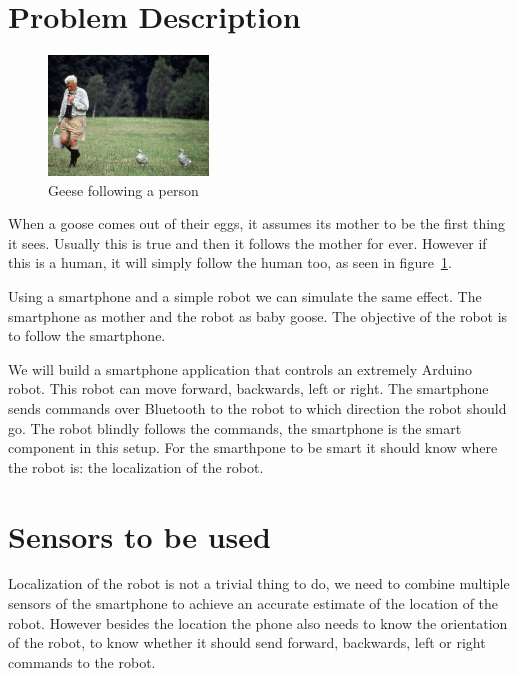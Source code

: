 \documentclass{article}
\author{Arian Stolwijk}
\begin{document}
\section{Problem Description}

\begin{figure}
  \vspace{-30pt}
  \begin{center}
    \includegraphics[width=0.38\textwidth]{geese.jpg}
    \vspace{-20pt}
  \end{center}
  \caption{Geese following a person}
\label{fig:geese}
\end{figure}

When a goose comes out of their eggs, it assumes its mother to be the first
thing it sees. Usually this is true and then it follows the mother for ever.
However if this is a human, it will simply follow the human too, as seen in
figure~\ref{fig:geese}.

Using a smartphone and a simple robot we can simulate the same effect. The
smartphone as mother and the robot as baby goose. The objective of the robot is
to follow the smartphone.

We will build a smartphone application that controls an extremely Arduino
robot. This robot can move forward, backwards, left or right. The smartphone
sends commands over Bluetooth to the robot to which direction the robot should
go. The robot blindly follows the commands, the smartphone is the smart
component in this setup. For the smarthpone to be smart it should know where
the robot is: the localization of the robot.

\section{Sensors to be used}

Localization of the robot is not a trivial thing to do, we need to combine
multiple sensors of the smartphone to achieve an accurate estimate of the
location of the robot. However besides the location the phone also needs to
know the orientation of the robot, to know whether it should send forward,
backwards, left or right commands to the robot.
\end{document}
